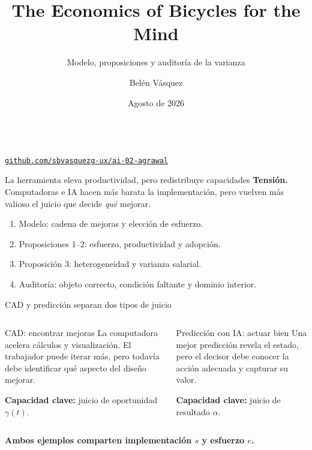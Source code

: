 \documentclass[aspectratio=169,11pt]{beamer}
\title[Agrawal et al. (2025)]{The Economics of Bicycles for the Mind}
\subtitle{Modelo, proposiciones y auditoría de la varianza}
\author{Belén Vásquez}
\institute{Universidad del Pacífico}
\date{Agosto de 2026}
\begin{document}
\begin{frame}[plain]
  \titlepage
  \vspace{-0.8em}
  \begin{center}\small
    \paperref\\[0.45em]
    \href{\RepoURL}{\texttt{github.com/sbvasquezg-ux/ai-02-agrawal}}
  \end{center}
\end{frame}

\begin{frame}{La herramienta eleva productividad, pero redistribuye capacidades}
  \textbf{Tensión.} Computadoras e IA hacen más barata la implementación, pero
  vuelven más valioso el juicio que decide \emph{qué} mejorar.

  \medskip
  \begin{enumerate}
    \item Modelo: cadena de mejoras y elección de esfuerzo.
    \item Proposiciones 1--2: esfuerzo, productividad y adopción.
    \item Proposición 3: heterogeneidad y varianza salarial.
    \item Auditoría: objeto correcto, condición faltante y dominio interior.
  \end{enumerate}

\end{frame}

\begin{frame}{CAD y predicción separan dos tipos de juicio}
  \begin{columns}[T,onlytextwidth]
    \begin{block}{CAD: encontrar mejoras}
      La computadora acelera cálculos y visualización. El trabajador puede
      iterar más, pero todavía debe identificar qué aspecto del diseño mejorar.

      \medskip
      \textbf{Capacidad clave:} juicio de oportunidad $\gamma(t)$.
    \end{block}
    \begin{block}{Predicción con IA: actuar bien}
      Una mejor predicción revela el estado, pero el decisor debe conocer la
      acción adecuada y capturar su valor.

      \medskip
      \textbf{Capacidad clave:} juicio de resultado $\alpha$.
    \end{block}
  \end{columns}
  \medskip
  \centering
  \textbf{Ambos ejemplos comparten implementación $s$ y esfuerzo $e$.}
\end{frame}
\end{document}
